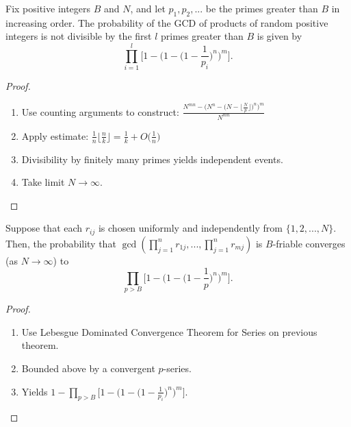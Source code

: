 \documentclass[11pt,xcolor={dvipsnames}]{beamer}
\begin{document}
	\begin{frame}
		\begin{theorem}
			Fix positive integers $B$ and $N$, and let $p_1, p_2, ...$ be the primes greater than $B$ in increasing order. The probability of the GCD of products of random positive integers is not divisible by the first $l$ primes greater than $B$ is given by
			$$\prod_{i=1}^{l} \Big[1 - \Big(1 - \Big(1-\frac{1}{p_i}\Big)^n\Big)^m\Big].$$
		\end{theorem}
			\begin{proof}
		\begin{enumerate}
			\item Use counting arguments to construct:
			$\frac{N^{mn} - \Big(N^n - \Big(N - \Big\lfloor\frac{N}{p}\Big\rfloor\Big)^n\Big)^m}{N^{mn}}$
			\item Apply estimate: $\frac{1}{n} \Big\lfloor \frac{n}{k} \Big\rfloor = \frac{1}{k} + O\Big(\frac{1}{n}\Big)$
			\item Divisibility by finitely many primes yields independent events.
			\item Take limit $N \to \infty$. 
		\end{enumerate}
		\end{proof}
	\end{frame}

	\begin{frame}
		\begin{theorem}
			Suppose that each $r_{ij}$ is chosen uniformly and independently from $\{1, 2, ..., N\}$. Then, the probability that $\gcd(\prod_{j=1}^n r_{1j}, ... , \prod_{j=1}^n r_{mj})$ is $B$-friable converges (as $N \to \infty$) to
			$$\prod_{p>B} \Big[1 - \Big(1 - \Big(1 - \frac{1}{p}\Big)^n \Big)^m \Big].$$
		\end{theorem}
		\begin{proof}
			\begin{enumerate}
				\item Use Lebesgue Dominated Convergence Theorem for Series on previous theorem.
				\item Bounded above by a convergent $p$-series.
				\item Yields $ 1 - \prod_{p > B} \Big[1 - \Big(1 - \Big(1 - \frac{1}{p_i}  \Big)^n\Big)^m\Big].$
			\end{enumerate}
		\end{proof}
	\end{frame}
\end{document}

